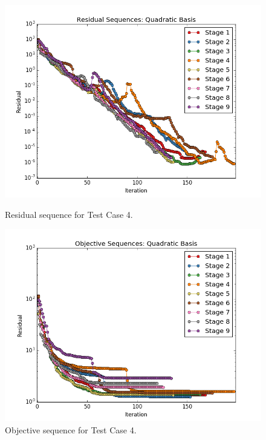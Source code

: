 \documentclass[]{aiaa-tc}%
\begin{document}
\begin{figure}[!ht]
\centering
\begin{minipage}{.50\textwidth}
 \centering
 \includegraphics[width=.8\textwidth]{../images/residual_case4}
 \caption{Residual sequence for Test Case 4.}
 \label{fig:residual_case4}
\end{minipage}%
\begin{minipage}{.50\textwidth}
 \centering
 \includegraphics[width=.8\textwidth]{../images/objective_case4}
 \caption{Objective sequence for Test Case 4.}
 \label{fig:objective_case4}
\end{minipage}
\end{figure}
\end{document}

